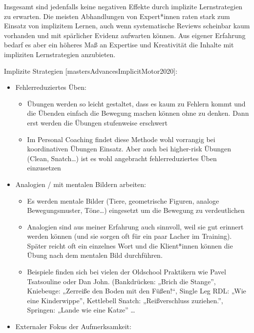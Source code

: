 \documentclass[
  letterpaper,
  DIV=11,
  numbers=noendperiod]{scrreprt}
\providecommand{\tightlist}{%
  \setlength{\itemsep}{0pt}\setlength{\parskip}{0pt}}
\begin{document}
Insgesamt sind jedenfalls keine negativen Effekte durch implizite
Lernstrategien zu erwarten. Die meisten Abhandlungen von Expert*innen
raten stark zum Einsatz von implizitem Lernen, auch wenn systematische
Reviews scheinbar kaum vorhanden und mit spärlicher Evidenz aufwarten
können. Aus eigener Erfahrung bedarf es aber ein höheres Maß an
Expertise und Kreativität die Inhalte mit impliziten Lernstrategien
anzubieten.

Implizite Strategien {[}mastersAdvancesImplicitMotor2020{]}:

\begin{itemize}
\tightlist
\item
  Fehlerreduziertes Üben:

  \begin{itemize}
  \tightlist
  \item
    Übungen werden so leicht gestaltet, dass es kaum zu Fehlern kommt
    und die Übenden einfach die Bewegung machen können ohne zu denken.
    Dann erst werden die Übungen stufenweise erschwert
  \item
    Im Personal Coaching findet diese Methode wohl vorrangig bei
    koordinativen Übungen Einsatz. Aber auch bei higher-risk Übungen
    (Clean, Snatch\ldots) ist es wohl angebracht fehlerreduziertes Üben
    einzusetzen
  \end{itemize}
\item
  Analogien / mit mentalen Bildern arbeiten:

  \begin{itemize}
  \tightlist
  \item
    Es werden mentale Bilder (Tiere, geometrische Figuren, analoge
    Bewegungsmuster, Töne\ldots) eingesetzt um die Bewegung zu
    verdeutlichen
  \item
    Analogien sind aus meiner Erfahrung auch sinnvoll, weil sie gut
    erinnert werden können (und sie sorgen oft für ein paar Lacher im
    Training). Später reicht oft ein einzelnes Wort und die Klient*innen
    können die Übung nach dem mentalen Bild durchführen.
  \item
    Beispiele finden sich bei vielen der Oldschool Praktikern wie Pavel
    Tsatsouline oder Dan John. (Bankdrücken: „Brich die Stange'',
    Kniebeuge: „Zerreiße den Boden mit den Füßen!``, Single Leg RDL:
    „Wie eine Kinderwippe'', Kettlebell Snatch: „Reißverschluss
    zuziehen.'', Springen: „Lande wie eine Katze'' \ldots{}
  \end{itemize}
\item
  Externaler Fokus der Aufmerksamkeit:


\end{itemize}
\end{document}
